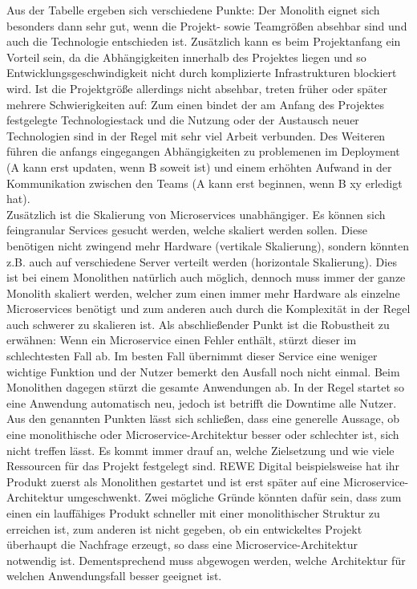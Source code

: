 Aus der Tabelle ergeben sich verschiedene Punkte: Der Monolith eignet sich besonders dann sehr gut, wenn die Projekt- sowie Teamgrößen absehbar sind und auch die Technologie entschieden ist. Zusätzlich kann es beim Projektanfang ein Vorteil sein, da die Abhängigkeiten innerhalb des Projektes liegen und so Entwicklungsgeschwindigkeit nicht durch komplizierte Infrastrukturen blockiert wird. 
Ist die Projektgröße allerdings nicht absehbar, treten früher oder später mehrere Schwierigkeiten auf: Zum einen bindet der am Anfang des Projektes festgelegte Technologiestack und die Nutzung oder der Austausch neuer Technologien sind in der Regel mit sehr viel Arbeit verbunden. Des Weiteren führen die anfangs eingegangen Abhängigkeiten zu problemenen im Deployment (A kann erst updaten, wenn B soweit ist) und einem erhöhten Aufwand in der Kommunikation zwischen den Teams (A kann erst beginnen, wenn B xy erledigt hat). \\

Zusätzlich ist die Skalierung von Microservices unabhängiger. Es können sich feingranular Services gesucht werden, welche skaliert werden sollen. Diese benötigen nicht zwingend mehr Hardware (vertikale Skalierung), sondern könnten z.B. auch auf verschiedene Server verteilt werden (horizontale Skalierung). Dies ist bei einem Monolithen natürlich auch möglich, dennoch muss immer der ganze Monolith skaliert werden, welcher zum einen immer mehr Hardware als einzelne Microservices benötigt und zum anderen auch durch die Komplexität in der Regel auch schwerer zu skalieren ist.\cite{wolff2018mic_praxis}   
Als abschließender Punkt ist die Robustheit zu erwähnen: Wenn ein Microservice einen Fehler enthält, stürzt dieser im schlechtesten Fall ab. Im besten Fall übernimmt dieser Service eine weniger wichtige Funktion und der Nutzer bemerkt den Ausfall noch nicht einmal. Beim Monolithen dagegen stürzt die gesamte Anwendungen ab. In der Regel startet so eine Anwendung automatisch neu, jedoch ist betrifft die Downtime alle Nutzer. \\

Aus den genannten Punkten lässt sich schließen, dass eine generelle Aussage, ob eine monolithische oder Microservice-Architektur besser oder schlechter ist, sich nicht treffen lässt. Es kommt immer drauf an, welche Zielsetzung und wie viele Ressourcen für das Projekt festgelegt sind. REWE Digital beispielsweise hat ihr Produkt zuerst als Monolithen gestartet und ist erst später auf eine Microservice-Architektur umgeschwenkt.\cite{rewe2019mic_ppp} Zwei mögliche Gründe könnten dafür sein, dass zum einen ein lauffähiges Produkt schneller mit einer monolithischer Struktur zu erreichen ist, zum anderen ist nicht gegeben, ob ein entwickeltes Projekt überhaupt die Nachfrage erzeugt, so dass eine Microservice-Architektur notwendig ist. Dementsprechend muss abgewogen werden, welche Architektur für welchen Anwendungsfall besser geeignet ist.\cite{wolff2018mic_praxis} 

